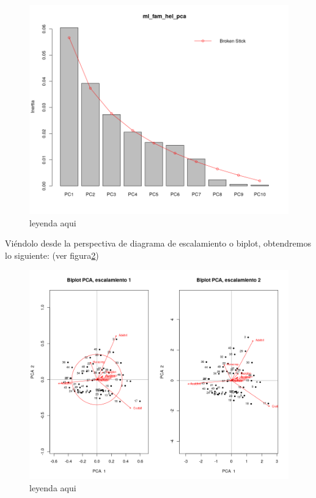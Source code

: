 \documentclass[11pt,]{article}
\begin{document}
\begin{figure}
\centering
\includegraphics{quebrada_especie.png}
\caption{\label{fig:quebrada_especie}leyenda aqui}
\end{figure}

Viéndolo desde la perspectiva de diagrama de escalamiento o biplot,
obtendremos lo siguiente: (ver figura\ref{fig:biplot_especie})

\begin{figure}
\centering
\includegraphics{biplot_especie.png}
\caption{\label{fig:biplot_especie}leyenda aqui}
\end{figure}
\end{document}
